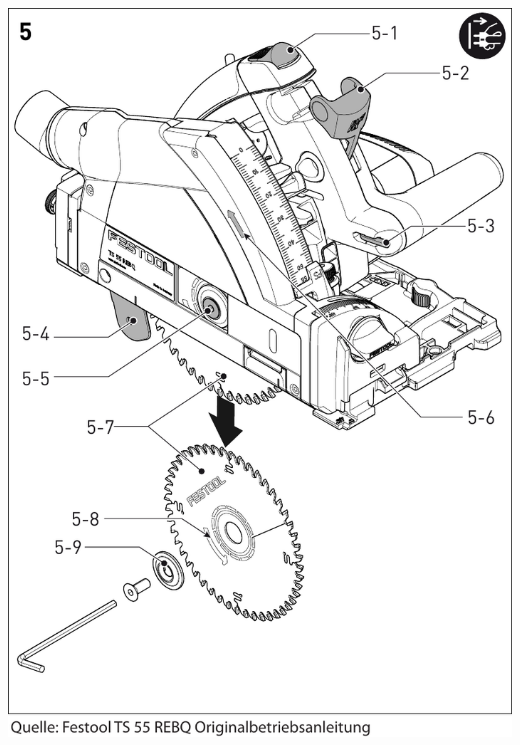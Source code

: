 \documentclass{\basedir/fablab-document}
\begin{document}
\begin{minipage}{90mm}
    \centering
	\includegraphics[width=1\textwidth]{img/festool-blattwechsel.pdf}
	\label{fig:blattwechsel}
\end{minipage}


\newpage
\end{document}
